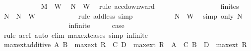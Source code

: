 \begin{isabellebody}
\ \ \ \ \ \ \ \ \ \ \isamarkupfalse%
\ {\isacartoucheopen}M\ {\isasymin}\ {\isacharquery}{\kern0pt}W{\isacartoucheclose}\ \isamarkupfalse%
\ {\isachardoublequoteopen}{\isacharquery}{\kern0pt}N{}\ {\isasymin}\ {\isacharquery}{\kern0pt}W{\isachardoublequoteclose}\ \isamarkupfalse%
\ {\isacharparenleft}{\kern0pt}rule\ acc{\isacharunderscore}{\kern0pt}downward{\isacharparenright}{\kern0pt}\isanewline
\ \ \ \ \ \ \ \ \isamarkupfalse%
\isanewline
\ \ \ \ \ \ \ \ \isamarkupfalse%
\ finites\ \isamarkupfalse%
\ {\isachardoublequoteopen}{\isacharquery}{\kern0pt}N{}\ {\isasymunion}\ {\isacharquery}{\kern0pt}N{}\ {\isasymin}\ {\isacharquery}{\kern0pt}W{\isachardoublequoteclose}\isanewline
\ \ \ \ \ \ \ \ \ \ \isamarkupfalse%
\ {\isacharparenleft}{\kern0pt}rule\ add{\isacharunderscore}{\kern0pt}less{\isacharparenright}{\kern0pt}\ simp\isanewline
\ \ \ \ \ \ \ \ \isamarkupfalse%
\ \isamarkupfalse%
\ {\isachardoublequoteopen}N\ {\isasymin}\ {\isacharquery}{\kern0pt}W{\isachardoublequoteclose}\ \isamarkupfalse%
\ {\isacharparenleft}{\kern0pt}simp\ only{\isacharcolon}{\kern0pt}\ N{\isacharparenright}{\kern0pt}\isanewline
\ \ \ \ \ \ \isamarkupfalse%
\isanewline
\ \ \ \ \isamarkupfalse%
\isanewline
\ \ \isamarkupfalse%
\isanewline
\ \ \ \ \isamarkupfalse%
\ infinite\isanewline
\ \ \ \ \isamarkupfalse%
\ {\isacharquery}{\kern0pt}case\isanewline
\ \ \ \ \ \ \isamarkupfalse%
\ {\isacharparenleft}{\kern0pt}rule\ accI{\isacharparenright}{\kern0pt}\ {\isacharparenleft}{\kern0pt}auto\ elim{\isacharcolon}{\kern0pt}\ max{\isacharunderscore}{\kern0pt}ext{\isachardot}{\kern0pt}cases\ simp{\isacharcolon}{\kern0pt}\ infinite{\isacharparenright}{\kern0pt}\isanewline
\ \ \isamarkupfalse%
\isanewline
{}\isamarkupfalse%
%
\endisatagproof
{\isafoldproof}%
%
\isadelimproof
\isanewline
%
\endisadelimproof
\isanewline
{}\isamarkupfalse%
\ max{\isacharunderscore}{\kern0pt}ext{\isacharunderscore}{\kern0pt}additive{\isacharcolon}{\kern0pt}\ {\isachardoublequoteopen}{\isacharparenleft}{\kern0pt}A{\isacharcomma}{\kern0pt}\ B{\isacharparenright}{\kern0pt}\ {\isasymin}\ max{\isacharunderscore}{\kern0pt}ext\ R\ {\isasymLongrightarrow}\ {\isacharparenleft}{\kern0pt}C{\isacharcomma}{\kern0pt}\ D{\isacharparenright}{\kern0pt}\ {\isasymin}\ max{\isacharunderscore}{\kern0pt}ext\ R\ {\isasymLongrightarrow}\ {\isacharparenleft}{\kern0pt}A\ {\isasymunion}\ C{\isacharcomma}{\kern0pt}\ B\ {\isasymunion}\ D{\isacharparenright}{\kern0pt}\ {\isasymin}\ max{\isacharunderscore}{\kern0pt}ext\ R{\isachardoublequoteclose}\isanewline

\end{isabellebody}
